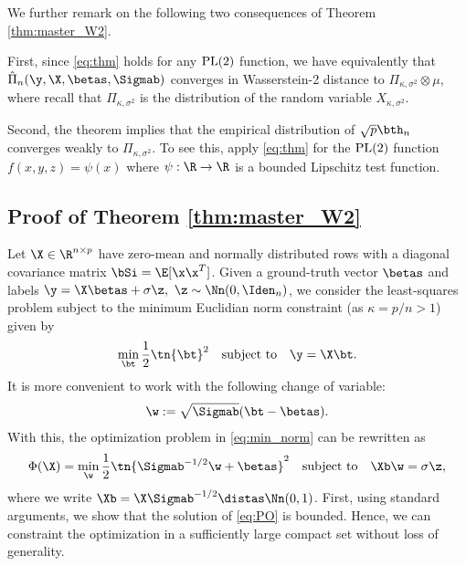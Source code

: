 We further remark on the following two consequences of Theorem \ref{thm:master_W2}. 

First, since \eqref{eq:thm} holds for any $\rm{PL}(2)$ function, we have equivalently that $\hat\Pi_n(\y,\X,\betas,\Sigmab)$ converges in Wasserstein-2 distance to $\Pi_{\kappa,\sigma^2}\otimes\mu$, where recall that $\Pi_{\kappa,\sigma^2}$ is the distribution of the random variable $X_{\kappa,\sigma^2}$.

Second, the theorem implies that the empirical distribution of $\sqrt{p}\bth_n$ converges weakly to $\Pi_{\kappa,\sigma^2}$. To see this, apply \eqref{eq:thm} for the $\rm{PL}(2)$ function $f(x,y,z) = \psi(x)$ where  $\psi:\R\rightarrow\R$ is a bounded Lipschitz test function. 

\subsection{Proof of Theorem \ref{thm:master_W2}}
\vspace{5pt}
Let $\X\in\R^{n\times p}$ have zero-mean and normally distributed rows with a diagonal covariance matrix $\bSi=\E[\x\x^T]$. Given a ground-truth vector $\betas$ and labels $\y=\X\betas+\sigma \z,~\z\sim\Nn(0,\Iden_n)$, we consider the least-squares problem subject to the minimum Euclidian norm constraint (as $\kappa=p/n>1$) given by
\begin{align}\label{eq:PO_beta}
\min_{\bt}\frac{1}{2}\tn{\bt}^2\quad\text{subject to}\quad \y=\X\bt.
\end{align}
It is more convenient to work with the following change of variable: 
\begin{align}\label{eq:w}
\w:=\sqrt{\Sigmab}(\bt-\betas).
\end{align}
 With this, the optimization problem  in \eqref{eq:min_norm} can be rewritten as
\begin{align}\label{eq:PO}
\Phi(\X)=\min_{\w} \frac{1}{2}\tn{\Sigmab^{-1/2}\w+\betas}^2\quad\text{subject to}\quad \Xb\w=\sigma \z,
\end{align}
where we write $\Xb=\X\Sigmab^{-1/2}\distas\Nn(0,1)$. First, using standard arguments, we show that the solution of \eqref{eq:PO} is bounded. Hence, we can constraint the optimization in a sufficiently large compact set without loss of generality.


